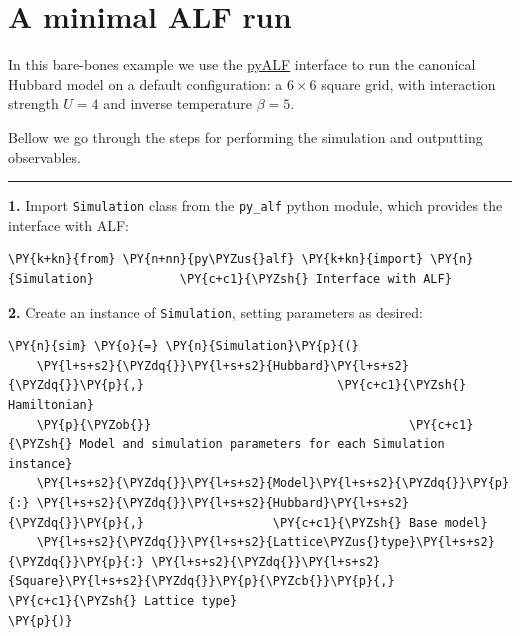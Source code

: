     
    

    
    \hypertarget{a-minimal-alf-run}{%
\section{A minimal ALF run}\label{a-minimal-alf-run}}

    In this bare-bones example we use the
\href{https://git.physik.uni-wuerzburg.de/ALF/pyALF}{pyALF} interface to
run the canonical Hubbard model on a default configuration: a
\(6\times6\) square grid, with interaction strength \(U=4\) and inverse
temperature \(\beta = 5\).

Bellow we go through the steps for performing the simulation and
outputting observables.

\begin{center}\rule{0.5\linewidth}{0.5pt}\end{center}

\textbf{1.} Import \texttt{Simulation} class from the \texttt{py\_alf}
python module, which provides the interface with ALF:

    \begin{tcolorbox}[breakable, size=fbox, boxrule=1pt, pad at break*=1mm,colback=cellbackground, colframe=cellborder]
\begin{Verbatim}[commandchars=\\\{\}]
\PY{k+kn}{from} \PY{n+nn}{py\PYZus{}alf} \PY{k+kn}{import} \PY{n}{Simulation}            \PY{c+c1}{\PYZsh{} Interface with ALF}
\end{Verbatim}
\end{tcolorbox}

    \textbf{2.} Create an instance of \texttt{Simulation}, setting
parameters as desired:

    \begin{tcolorbox}[breakable, size=fbox, boxrule=1pt, pad at break*=1mm,colback=cellbackground, colframe=cellborder]
\begin{Verbatim}[commandchars=\\\{\}]
\PY{n}{sim} \PY{o}{=} \PY{n}{Simulation}\PY{p}{(}
    \PY{l+s+s2}{\PYZdq{}}\PY{l+s+s2}{Hubbard}\PY{l+s+s2}{\PYZdq{}}\PY{p}{,}                           \PY{c+c1}{\PYZsh{} Hamiltonian}
    \PY{p}{\PYZob{}}                                    \PY{c+c1}{\PYZsh{} Model and simulation parameters for each Simulation instance}
    \PY{l+s+s2}{\PYZdq{}}\PY{l+s+s2}{Model}\PY{l+s+s2}{\PYZdq{}}\PY{p}{:} \PY{l+s+s2}{\PYZdq{}}\PY{l+s+s2}{Hubbard}\PY{l+s+s2}{\PYZdq{}}\PY{p}{,}                  \PY{c+c1}{\PYZsh{} Base model}
    \PY{l+s+s2}{\PYZdq{}}\PY{l+s+s2}{Lattice\PYZus{}type}\PY{l+s+s2}{\PYZdq{}}\PY{p}{:} \PY{l+s+s2}{\PYZdq{}}\PY{l+s+s2}{Square}\PY{l+s+s2}{\PYZdq{}}\PY{p}{\PYZcb{}}\PY{p}{,}           \PY{c+c1}{\PYZsh{} Lattice type}
\PY{p}{)}
\end{Verbatim}
\end{tcolorbox}

